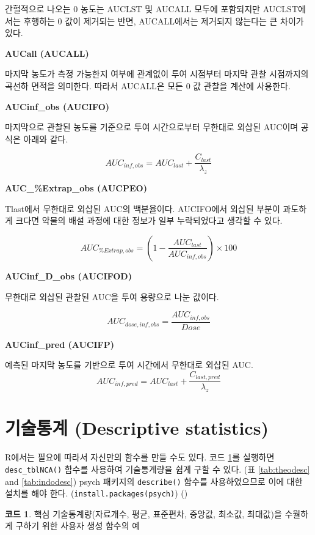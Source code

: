 \documentclass[
  11pt,
  krantz2, a4paper, twoside]{krantz}
\theoremstyle{definition}
\theoremstyle{definition}
\newtheorem{example}{코드}[chapter]
\theoremstyle{definition}
\theoremstyle{definition}
\theoremstyle{remark}
\begin{document}
간헐적으로 나오는 0 농도는 AUCLST 및 AUCALL 모두에 포함되지만 AUCLST에서는 후행하는 0 값이 제거되는 반면, AUCALL에서는 제거되지 않는다는 큰 차이가 있다.

\textbf{AUCall (AUCALL)}

마지막 농도가 측정 가능한지 여부에 관계없이 투여 시점부터 마지막 관찰 시점까지의 곡선하 면적을 의미한다. 따라서 AUCALL은 모든 0 값 관찰을 계산에 사용한다.

\textbf{AUCinf\_obs (AUCIFO)}

마지막으로 관찰된 농도를 기준으로 투여 시간으로부터 무한대로 외삽된 AUC이며 공식은 아래와 같다.

\[AUC_{inf,obs} = AUC_{last} + \frac{C_{last}}{\lambda_{z}}\]

\textbf{AUC\_\%Extrap\_obs (AUCPEO)}

Tlast에서 무한대로 외삽된 AUC의 백분율이다. AUCIFO에서 외삽된 부분이 과도하게 크다면 약물의 배설 과정에 대한 정보가 일부 누락되었다고 생각할 수 있다.

\[AUC_{\% Extrap,obs} = (1 - \frac{AUC_{last}}{AUC_{inf,obs}}) \times 100\]

\textbf{AUCinf\_D\_obs (AUCIFOD)}

무한대로 외삽된 관찰된 AUC을 투여 용량으로 나눈 값이다.

\[AUC_{dose,inf,obs} = \frac{AUC_{inf,obs}}{Dose}\]

\textbf{AUCinf\_pred (AUCIFP)}

예측된 마지막 농도를 기반으로 투여 시간에서 무한대로 외삽된 AUC.
\[AUC_{inf,pred} = AUC_{last} + \frac{C_{last,pred}}{\lambda_{z}}\]

\section{기술통계 (Descriptive statistics)}\label{uxae30uxc220uxd1b5uxacc4-descriptive-statistics}


R에서는 필요에 따라서 자신만의 함수를 만들 수도 있다.
코드 \ref{exm:desctblnca}를 실행하면 \texttt{desc\_tblNCA()} 함수를 사용하여 기술통계량을 쉽게 구할 수 있다. (표 \ref{tab:theodesc} and \ref{tab:indodesc})
psych 패키지의 \texttt{describe()} 함수를 사용하였으므로 이에 대한 설치를 해야 한다. (\texttt{install.packages(\textquotesingle{}psych\textquotesingle{})}) ()

\begin{example}
\protect\hypertarget{exm:desctblnca}{}\label{exm:desctblnca}핵심 기술통계량(자료개수, 평균, 표준편차, 중앙값, 최소값, 최대값)을 수월하게 구하기 위한 사용자 생성 함수의 예
\end{example}
\end{document}
